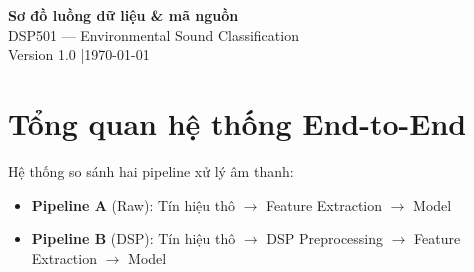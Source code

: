 \documentclass[12pt,a4paper]{article}
\begin{document}
\begin{center}
    {\LARGE\bfseries Sơ đồ luồng dữ liệu \& mã nguồn}\\[6pt]
    {\Large DSP501 — Environmental Sound Classification}\\[10pt]
    {\normalsize Version 1.0 \quad|\quad \today}
\end{center}

\tableofcontents
\newpage

\section{Tổng quan hệ thống End-to-End}

Hệ thống so sánh hai pipeline xử lý âm thanh:
\begin{itemize}[nosep]
    \item \textbf{Pipeline A} (Raw): Tín hiệu thô $\rightarrow$ Feature Extraction $\rightarrow$ Model
    \item \textbf{Pipeline B} (DSP): Tín hiệu thô $\rightarrow$ DSP Preprocessing $\rightarrow$ Feature Extraction $\rightarrow$ Model
\end{itemize}
\end{document}
